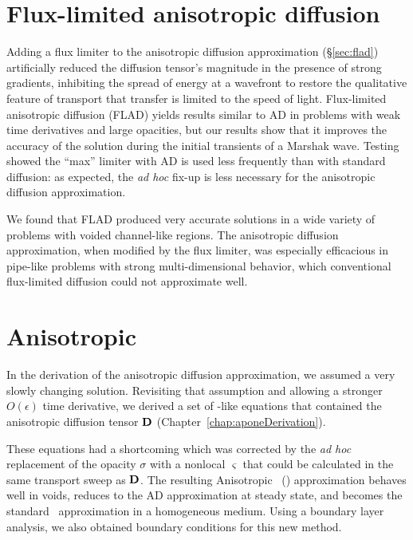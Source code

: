 \thesisclearpage
\section{Flux-limited anisotropic diffusion}

Adding a flux limiter to the anisotropic diffusion approximation
(\S\ref{sec:flad}) artificially reduced the diffusion tensor's magnitude in
the presence of strong gradients, inhibiting the spread of energy at a wavefront
to restore the qualitative feature of transport that transfer is limited to the
speed of light. Flux-limited anisotropic diffusion (FLAD) yields results
similar to AD in problems with weak time derivatives and large opacities, but
our results show that it improves the accuracy of the solution during the
initial transients of a Marshak wave.
Testing showed the ``max'' limiter with AD is used less frequently than with
standard diffusion: as expected, the \emph{ad hoc}
fix-up is less necessary for the anisotropic diffusion approximation.

We found that FLAD produced very accurate solutions in a wide
variety of problems with voided channel-like regions. The anisotropic diffusion
approximation, when modified by the flux limiter, was especially efficacious in
pipe-like problems with strong multi-dimensional behavior, which conventional
flux-limited diffusion could not approximate well.

\vspace{-9pt}
\section{Anisotropic \texorpdfstring{\Pone}{P1}}

In the derivation of the anisotropic diffusion approximation, we assumed a very
slowly changing solution. Revisiting that assumption and allowing a stronger
$O(\epsilon)$ time derivative, we
derived a set of \Pone-like equations that contained the anisotropic diffusion
tensor $\mathbf{D}$ (Chapter~\ref{chap:aponeDerivation}). 

These equations
had a shortcoming which was corrected by the \emph{ad hoc} replacement of the
opacity $\sigma$ with a nonlocal $\varsigma$ that could be
calculated in the same transport sweep as $\mathbf{D}$. The resulting Anisotropic
\Pone\ (\APone) approximation behaves well in voids, reduces to the AD
approximation at steady state, and becomes the standard \Pone\ approximation in
a homogeneous medium.
Using a boundary layer analysis, we also obtained boundary conditions for this
new method.


